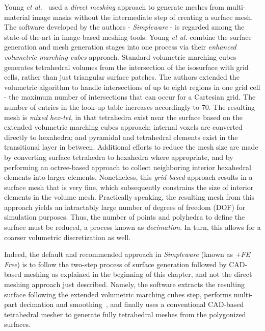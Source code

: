 Young \textit{et al.}~\cite{young_2008} used a \textit{direct meshing} approach to generate meshes from multi-material image masks without the intermediate step of creating a surface mesh. The software developed by the authors - \textit{Simpleware} - is regarded among the state-of-the-art in image-based meshing tools. Young \textit{et al.} combine the surface generation and mesh generation stages into one process via their \textit{enhanced volumetric marching cubes} approach. Standard volumetric marching cubes generates tetrahedral volumes from the intersection of the isosurface with grid cells, rather than just triangular surface patches. The authors extended the volumetric algorithm to handle intersections of up to eight regions in one grid cell - the maximum number of intersections that can occur for a Cartesian grid. The number of entries in the look-up table increases accordingly to 70. The resulting mesh is \textit{mixed hex-tet}, in that tetrahedra exist near the surface based on the extended volumetric marching cubes approach; internal voxels are converted directly to hexahedra; and pyramidal and tetrahedral elements exist in the transitional layer in between. Additional efforts to reduce the mesh size are made by converting surface tetrahedra to hexahedra where appropriate, and by performing an octree-based approach to collect neighboring interior hexahedral elements into larger elements. Nonetheless, this \textit{grid-based} approach results in a surface mesh that is very fine, which subsequently constrains the size of interior elements in the volume mesh. Practically speaking, the resulting mesh from this approach yields an intractably large number of degrees of freedom (DOF) for simulation purposes. Thus, the number of points and polyhedra to define the surface must be reduced, a process known as \textit{decimation}. In turn, this allows for a coarser volumetric discretization as well.

Indeed, the default and recommended approach in \textit{Simpleware} (known as \textit{+FE Free}) is to follow the two-step process of surface generation followed by CAD-based meshing as explained in the beginning of this chapter, and not the direct meshing approach just described. Namely, the software extracts the resulting surface following the extended volumetric marching cubes step, performs multi-part decimation and smoothing~\cite{egst}, and finally uses a conventional CAD-based tetrahedral mesher to generate fully tetrahedral meshes from the polygonized surfaces.

